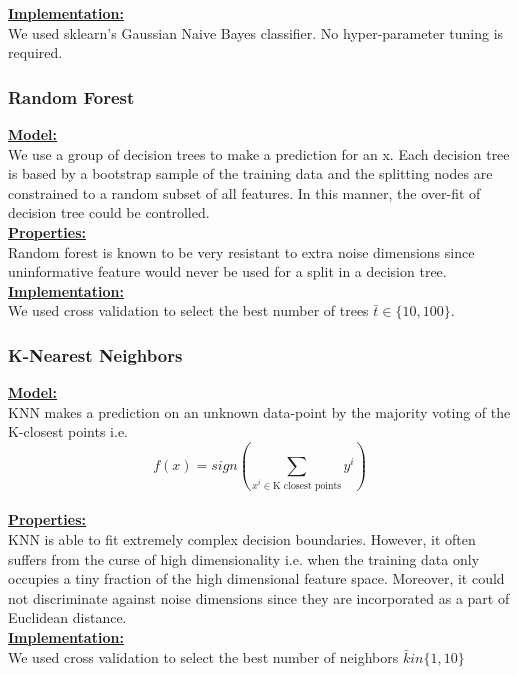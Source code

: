 \documentclass[8pts]{paper}
\begin{document}
\underline{\textbf{Implementation:}}\\
We used sklearn's Gaussian Naive Bayes classifier. No hyper-parameter tuning is required. \\

\subsubsection*{Random Forest}
\underline{\textbf{Model:}}\\
We use a group of decision trees to make a prediction for an x. Each decision tree is based by a bootstrap sample of the training data and the splitting nodes are constrained to a random subset of all features. In this manner, the over-fit of decision tree could be controlled.\\

\underline{\textbf{Properties:}}\\
Random forest is known to be very resistant to extra noise dimensions since uninformative feature would never be used for a split in a decision tree. \\

\underline{\textbf{Implementation:}}\\
We used cross validation to select the best number of trees $\bar{t} \in \{10, 100\}$.\\

\subsubsection*{K-Nearest Neighbors}
\underline{\textbf{Model:}}\\
KNN makes a prediction on an unknown data-point by the majority voting of the K-closest points i.e. $$f(x) = sign(\sum_{x^i \in \text{K closest points}} y^i) $$ \\

\underline{\textbf{Properties:}}\\
KNN is able to fit extremely complex decision boundaries. However, it often suffers from the curse of high dimensionality i.e. when the training data only occupies a tiny fraction of the high dimensional feature space. Moreover, it could not discriminate against noise dimensions since they are incorporated as a part of Euclidean distance. \\

\underline{\textbf{Implementation:}}\\
We used cross validation to select the best number of neighbors $\bar{k} in \{1, 10\}$ \\
\end{document}

